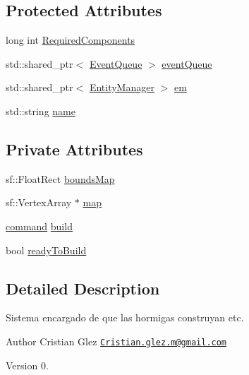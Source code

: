 \subsection*{Protected Attributes}
\begin{DoxyCompactItemize}
\item 
long int \hyperlink{classant_1_1_system_a4ef41cfc496e41ac6730f90629524ec7}{Required\+Components}
\item 
std\+::shared\+\_\+ptr$<$ \hyperlink{classant_1_1_event_queue}{Event\+Queue} $>$ \hyperlink{classant_1_1_system_a27e1814e13d161b5ef0e848e3da16d29}{event\+Queue}
\item 
std\+::shared\+\_\+ptr$<$ \hyperlink{classant_1_1_entity_manager}{Entity\+Manager} $>$ \hyperlink{classant_1_1_system_a5661d872ff769be150bd4e9a9552f6b9}{em}
\item 
std\+::string \hyperlink{classant_1_1_system_a60b3c00a760a3b4947ab1f1fc534a5b2}{name}
\end{DoxyCompactItemize}
\subsection*{Private Attributes}
\begin{DoxyCompactItemize}
\item 
sf\+::\+Float\+Rect \hyperlink{classant_1_1constructor_system_a72760b1f055879a614170e2a12882318}{bounds\+Map}
\item 
sf\+::\+Vertex\+Array $\ast$ \hyperlink{classant_1_1constructor_system_a4d5ae03552b88bbfdcda91608b19e036}{map}
\item 
\hyperlink{classant_1_1constructor_system_a0977052dc8865f8e79ae03b4f3e18d8a}{command} \hyperlink{classant_1_1constructor_system_a74af4d407eef12c65078236b9e230842}{build}
\item 
bool \hyperlink{classant_1_1constructor_system_a343406debd8f091bd1dccec63a86b8e9}{ready\+To\+Build}
\end{DoxyCompactItemize}


\subsection{Detailed Description}
Sistema encargado de que las hormigas construyan etc. 

\begin{DoxyAuthor}{Author}
Cristian Glez \href{mailto:Cristian.glez.m@gmail.com}{\tt Cristian.\+glez.\+m@gmail.\+com} 
\end{DoxyAuthor}
\begin{DoxyVersion}{Version}
0. 
\end{DoxyVersion}


